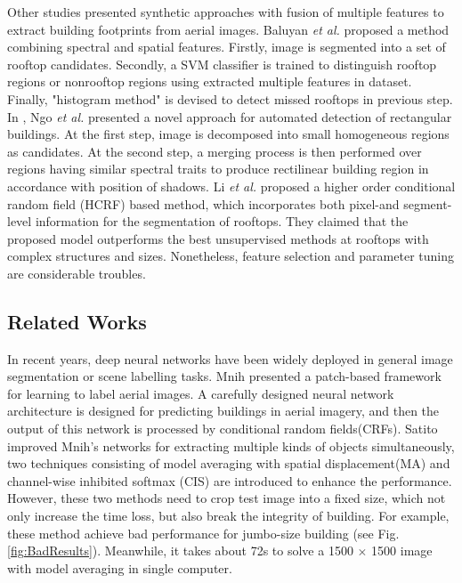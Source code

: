 \documentclass[runningheads]{llncs}
\begin{document}
   Other studies presented synthetic approaches with fusion of multiple features to extract building footprints from aerial images. Baluyan \textit{et al.} \cite{baluyan2013novel} proposed a method combining spectral and spatial features. Firstly, image is segmented into a set of rooftop candidates. Secondly, a SVM classifier is trained to distinguish rooftop regions or nonrooftop regions using extracted multiple features in dataset. Finally, "histogram method" is devised to detect missed rooftops in previous step. In \cite{ngoautomatic}, Ngo \textit{et al.} presented a novel approach for automated detection of rectangular buildings. At the first step, image is decomposed into small homogeneous regions as candidates. At the second step, a merging process is then performed over regions having similar spectral traits to produce rectilinear building region in accordance with position of shadows. Li \textit{et al.} \cite{li2015robust} proposed a higher order conditional random field (HCRF) based method, which incorporates both pixel-and segment-level information for the segmentation of rooftops. They claimed that the proposed model outperforms the best unsupervised methods at rooftops with complex structures and sizes. Nonetheless, feature selection and parameter tuning are considerable troubles.
    
\subsection{Related Works}
   In recent years, deep neural networks have been widely deployed in general image segmentation or scene labelling tasks. Mnih \cite{Mnih2013Machine} presented a patch-based framework for learning to label aerial images. A carefully designed neural network architecture is designed for predicting buildings in aerial imagery, and then the output of this network is processed by conditional random fields(CRFs). Satito \cite{Saito2016Multiple} improved Mnih's networks for extracting multiple kinds of objects simultaneously, two techniques consisting of model averaging with spatial displacement(MA) and channel-wise inhibited softmax (CIS) are introduced to enhance the  performance. However, these two methods need to crop test image into a fixed size, which not only  increase the time loss, but also break the integrity of building. For example, these method achieve bad performance for jumbo-size building (see Fig. \ref{fig:BadResults}). Meanwhile, it takes about 72s to solve a 1500 $\times$ 1500 image with model averaging in single computer. 
 
\end{document}
